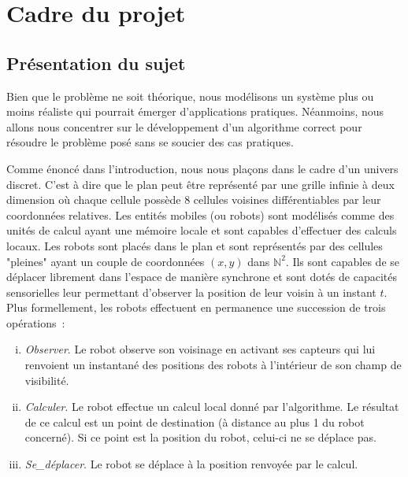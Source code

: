 \newcommand{\Observer}{\textit{Observer}\xspace}
\newcommand{\Calculer}{\textit{Calculer}\xspace}
\newcommand{\SeDeplacer}{\textit{Se\_déplacer}\xspace}

\section{Cadre du projet}

\subsection{Présentation du sujet}

Bien que le problème ne soit théorique, nous modélisons un système plus ou
moins réaliste qui pourrait émerger d'applications pratiques. Néanmoins, nous
allons nous concentrer sur le développement d'un algorithme correct pour
résoudre le problème posé sans se soucier des cas pratiques.

Comme énoncé dans l'introduction, nous nous plaçons dans le cadre d'un univers
discret. C'est à dire que le plan peut être représenté par une grille infinie à
deux dimension où chaque cellule possède 8 cellules voisines différentiables
par leur coordonnées relatives. Les entités mobiles (ou robots) sont modélisés
comme des unités de calcul ayant une mémoire locale et sont capables
d'effectuer des calculs locaux. Les robots sont placés dans le plan et sont
représentés par des cellules "pleines" ayant un couple de coordonnées $(x,y)$
dans $\mathbb{N}^2$. Ils sont capables de se déplacer librement dans l'espace
de manière synchrone et sont dotés de capacités sensorielles leur permettant
d'observer la position de leur voisin à un instant $t$. Plus formellement, les
robots effectuent en permanence une succession de trois opérations~:
\begin{enumerate}[(i)]
  \item \Observer. Le robot observe son voisinage en activant ses capteurs qui
  lui renvoient un instantané des positions des robots à l'intérieur de son
  champ de visibilité.
  \item \Calculer. Le robot effectue un calcul local donné par l'algorithme. Le
  résultat de ce calcul est un point de destination (à distance au plus 1 du
  robot concerné). Si ce point est la position du robot, celui-ci ne se déplace
  pas.
  \item \SeDeplacer. Le robot se déplace à la position renvoyée par le calcul.
  \\
\end{enumerate}

